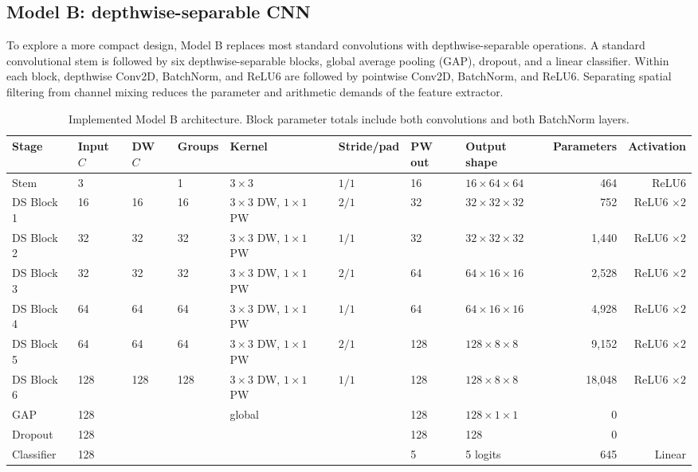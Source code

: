 \documentclass[11pt,a4paper]{article}
\newcommand{\dash}{\textemdash}
\begin{document}
\subsection{Model B: depthwise-separable CNN}
To explore a more compact design, Model B replaces most standard convolutions with depthwise-separable operations. A standard convolutional stem is followed by six depthwise-separable blocks, global average pooling (GAP), dropout, and a linear classifier. Within each block, depthwise Conv2D, BatchNorm, and ReLU6 are followed by pointwise Conv2D, BatchNorm, and ReLU6. Separating spatial filtering from channel mixing reduces the parameter and arithmetic demands of the feature extractor.

\begin{table}[H]
\centering
\fontsize{6}{7}\selectfont
\setlength{\tabcolsep}{2pt}
\captionsetup{font=scriptsize}
\caption{Implemented Model B architecture. Block parameter totals include both convolutions and both BatchNorm layers.}
\begin{tabular*}{\linewidth}{@{\extracolsep{\fill}}llllllllrr}
\toprule
Stage & Input $C$ & DW $C$ & Groups & Kernel & Stride/pad & PW out & Output shape & Parameters & Activation\\
\midrule
Stem & 3 & \dash & 1 & $3\times3$ & $1/1$ & 16 & $16\times64\times64$ & 464 & ReLU6\\
DS Block 1 & 16 & 16 & 16 & $3\times3$ DW, $1\times1$ PW & $2/1$ & 32 & $32\times32\times32$ & 752 & ReLU6 $\times2$\\
DS Block 2 & 32 & 32 & 32 & $3\times3$ DW, $1\times1$ PW & $1/1$ & 32 & $32\times32\times32$ & 1,440 & ReLU6 $\times2$\\
DS Block 3 & 32 & 32 & 32 & $3\times3$ DW, $1\times1$ PW & $2/1$ & 64 & $64\times16\times16$ & 2,528 & ReLU6 $\times2$\\
DS Block 4 & 64 & 64 & 64 & $3\times3$ DW, $1\times1$ PW & $1/1$ & 64 & $64\times16\times16$ & 4,928 & ReLU6 $\times2$\\
DS Block 5 & 64 & 64 & 64 & $3\times3$ DW, $1\times1$ PW & $2/1$ & 128 & $128\times8\times8$ & 9,152 & ReLU6 $\times2$\\
DS Block 6 & 128 & 128 & 128 & $3\times3$ DW, $1\times1$ PW & $1/1$ & 128 & $128\times8\times8$ & 18,048 & ReLU6 $\times2$\\
GAP & 128 & \dash & \dash & global & \dash & 128 & $128\times1\times1$ & 0 & \dash\\
Dropout & 128 & \dash & \dash & \dash & \dash & 128 & 128 & 0 & \dash\\
Classifier & 128 & \dash & \dash & \dash & \dash & 5 & 5 logits & 645 & Linear\\
\bottomrule
\end{tabular*}
\end{table}
\end{document}
